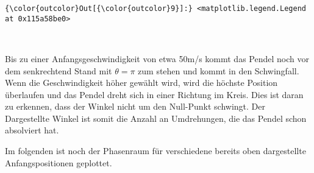 \documentclass[11pt]{article}
\begin{document}
\begin{Verbatim}[commandchars=\\\{\}]
{\color{outcolor}Out[{\color{outcolor}9}]:} <matplotlib.legend.Legend at 0x115a58be0>
\end{Verbatim}
            
    \begin{center}
    \end{center}
    { \hspace*{\fill} \\}
    
    Bis zu einer Anfangsgeschwindigkeit von etwa 50m/s kommt das Pendel noch
vor dem senkrechtend Stand mit \(\theta=\pi\) zum stehen und kommt in
den Schwingfall. Wenn die Geschwindigkeit höher gewählt wird, wird die
höchste Position überlaufen und das Pendel dreht sich in einer Richtung
im Kreis. Dies ist daran zu erkennen, dass der Winkel nicht um den
Null-Punkt schwingt. Der Dargestellte Winkel ist somit die Anzahl an
Umdrehungen, die das Pendel schon absolviert hat.

Im folgenden ist noch der Phasenraum für verschiedene bereits oben
dargestellte Anfangspositionen geplottet.
\end{document}
